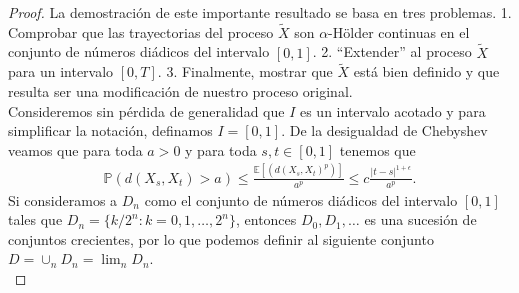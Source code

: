 \begin{proof}
La demostración de este importante resultado se basa en tres problemas. 1. Comprobar que las trayectorias del proceso $\tilde{X}$ son $\alpha$-Hölder continuas en el conjunto de números diádicos del intervalo $[0,1]$. 2. ``Extender'' al proceso $\tilde{X}$ para un intervalo $[0, T]$. 3. Finalmente, mostrar que $\tilde{X}$ está bien definido y que resulta ser una modificación de nuestro proceso original. \\

Consideremos sin pérdida de generalidad que $I$ es un intervalo acotado y para simplificar la notación, definamos $I = [0, 1]$. De la desigualdad de Chebyshev veamos que para toda $a > 0$ y para toda $s, t \in [0, 1]$ tenemos que
	\begin{align}
	\mathbb{P} \left(d(X_s, X_t) > a \right) \leq \frac{\mathbb{E} \left[\left(d(X_s, X_t)^p\right)\right]}{a^p} \leq c \frac{|t-s|^{1+\epsilon}}{a^p}.\label{aca} 
	\end{align}
Si consideramos a $D_n$ como el conjunto de números diádicos del intervalo $[0, 1]$ tales que $D_n = \{k / 2^n : k = 0, 1, \ldots, 2^n\}$, entonces $D_0, D_1, \ldots $ es una sucesión de conjuntos crecientes, por lo que podemos definir al siguiente conjunto $D = \cup_n D_n = \lim_n D_n$. \\


\end{proof}
